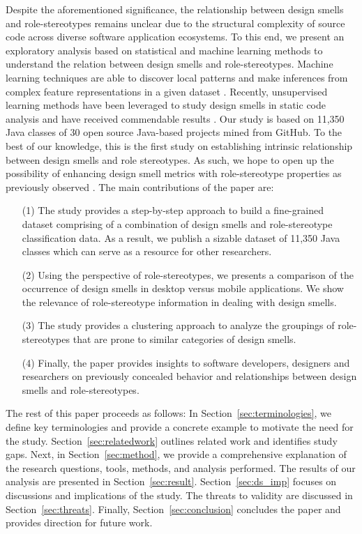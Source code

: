 \documentclass[AMA,Times1COL]{WileyNJDv5} %
\begin{document}
Despite the aforementioned significance, the relationship between design smells and role-stereotypes remains unclear due to  the structural complexity of source code across diverse software application ecosystems. To this end, we present an exploratory analysis based on statistical and machine learning methods to understand the relation between design smells and role-stereotypes. Machine learning techniques are able to discover local patterns and make inferences from complex feature representations in a given dataset \cite{awad2015machine}. Recently, unsupervised learning methods have been leveraged to study design smells in static code analysis and have received commendable results \cite{caram2019machine,imran2019design,palomba2017investigating,tahmid2016understanding}. Our study is based on 11,350 Java classes of 30 open source Java-based projects mined from GitHub. To the best of our knowledge, this is the first study on establishing intrinsic relationship between design smells and role stereotypes.
As such, we hope to open up the possibility of enhancing design smell metrics with role-stereotype properties as previously observed \cite{nurwidyantoro2019automated}. The main contributions of the paper are:
\begin{itemize}
	\item [(1)] The study provides a step-by-step approach to build a fine-grained dataset comprising of a combination of design smells and role-stereotype classification data. As a result, we publish a sizable dataset of 11,350 Java classes which can serve as a resource for other researchers.
	\item [(2)] Using the perspective of role-stereotypes, we presents a comparison of the occurrence of design smells in desktop versus mobile applications. We show the relevance of role-stereotype information in dealing with design smells.
	\item [(3)]The study provides a clustering approach to analyze the groupings of role-stereotypes that are prone to similar categories of design smells.
	\item [(4)] Finally, the paper provides insights to software developers, designers and researchers on previously concealed behavior and relationships between design smells and role-stereotypes.
\end{itemize}

The rest of this paper proceeds as follows: In Section~\ref{sec:terminologies}, we define key terminologies and provide a concrete example to motivate the need for the study. Section~\ref{sec:relatedwork} outlines related work and identifies study gaps. Next, in Section~\ref{sec:method}, we provide a comprehensive explanation of the research questions, tools, methods, and analysis performed. The results of our analysis are presented in Section~\ref{sec:result}. Section~\ref{sec:ds_imp} focuses on discussions and implications of the study. The threats to validity are discussed in Section~\ref{sec:threats}. Finally, Section~\ref{sec:conclusion} concludes the paper and provides direction for future work.
\end{document}

